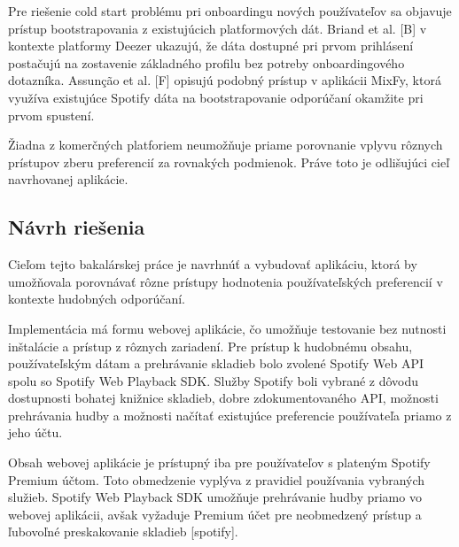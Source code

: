 Pre riešenie cold start problému pri onboardingu nových používateľov sa objavuje prístup bootstrapovania z existujúcich platformových dát. Briand et al. [B] v kontexte platformy Deezer ukazujú, že dáta dostupné pri prvom prihlásení postačujú na zostavenie základného profilu bez potreby onboardingového dotazníka. Assunção et al. [F] opisujú podobný prístup v aplikácii MixFy, ktorá využíva existujúce Spotify dáta na bootstrapovanie odporúčaní okamžite pri prvom spustení.

Žiadna z komerčných platforiem neumožňuje priame porovnanie vplyvu rôznych prístupov zberu preferencií za rovnakých podmienok. Práve toto je odlišujúci cieľ navrhovanej aplikácie.
  

\subsection{Návrh riešenia}

  
Cieľom tejto bakalárskej práce je navrhnúť a vybudovať aplikáciu, ktorá by umožňovala porovnávať rôzne prístupy hodnotenia používateľských preferencií v kontexte hudobných odporúčaní.

Implementácia má formu webovej aplikácie, čo umožňuje testovanie bez nutnosti inštalácie a prístup z rôznych zariadení. Pre prístup k hudobnému obsahu, používateľským dátam a prehrávanie skladieb bolo zvolené Spotify Web API spolu so Spotify Web Playback SDK. Služby Spotify boli vybrané z dôvodu dostupnosti bohatej knižnice skladieb, dobre zdokumentovaného API, možnosti prehrávania hudby a možnosti načítať existujúce preferencie používateľa priamo z jeho účtu.

Obsah webovej aplikácie je prístupný iba pre používateľov s plateným Spotify Premium účtom. Toto obmedzenie vyplýva z pravidiel používania vybraných služieb. Spotify Web Playback SDK umožňuje prehrávanie hudby priamo vo webovej aplikácii, avšak vyžaduje Premium účet pre neobmedzený prístup a ľubovoľné preskakovanie skladieb [spotify]. 
  
